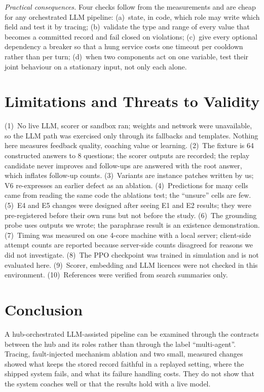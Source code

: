 \documentclass[runningheads]{llncs}
\begin{document}
\emph{Practical consequences.} Four checks follow from the measurements and are cheap for any orchestrated LLM pipeline: (a)~state, in code, which role may write which field and test it by tracing; (b)~validate the type and range of every value that becomes a committed record and fail closed on violations; (c)~give every optional dependency a breaker so that a hung service costs one timeout per cooldown rather than per turn; (d)~when two components act on one variable, test their joint behaviour on a stationary input, not only each alone.

\section{Limitations and Threats to Validity}\label{sec:limits}
(1)~No live LLM, scorer or sandbox ran; weights and network were unavailable, so the LLM path was exercised only through its fallbacks and templates. Nothing here measures feedback quality, coaching value or learning. (2)~The fixture is 64 constructed answers to 8 questions; the scorer outputs are recorded; the replay candidate never improves and follow-ups are answered with the root answer, which inflates follow-up counts. (3)~Variants are instance patches written by us; V6 re-expresses an earlier defect as an ablation. (4)~Predictions for many cells came from reading the same code the ablations test; the ``unsure'' cells are few. (5)~E4 and E5 changes were designed after seeing E1 and E2 results; they were pre-registered before their own runs but not before the study. (6)~The grounding probe uses outputs we wrote; the paraphrase result is an existence demonstration. (7)~Timing was measured on one 4-core machine with a local server; client-side attempt counts are reported because server-side counts disagreed for reasons we did not investigate. (8)~The PPO checkpoint was trained in simulation and is not evaluated here. (9)~Scorer, embedding and LLM licences were not checked in this environment. (10)~References were verified from search summaries only.

\section{Conclusion}
A hub-orchestrated LLM-assisted pipeline can be examined through the contracts between the hub and its roles rather than through the label ``multi-agent''. Tracing, fault-injected mechanism ablation and two small, measured changes showed what keeps the stored record faithful in a replayed setting, where the shipped system fails, and what its failure handling costs. They do not show that the system coaches well or that the results hold with a live model.
\end{document}
